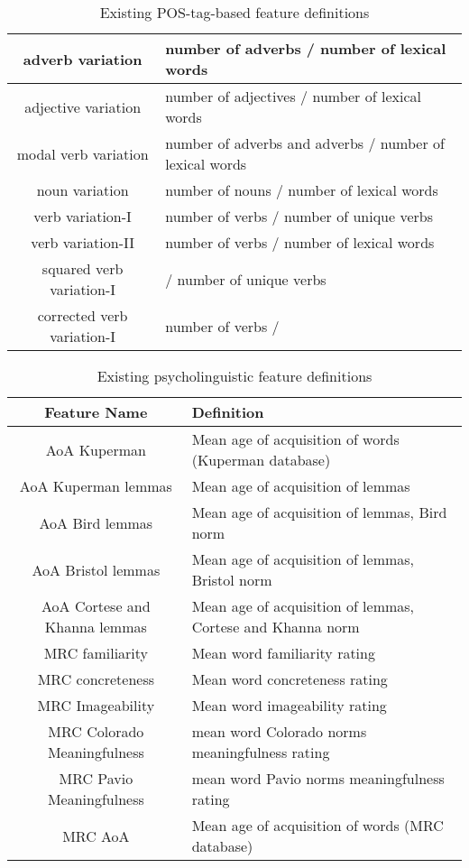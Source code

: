 \documentclass[11pt,a4paper]{article}
\theoremstyle{definition}
\begin{document}
\begin{table}
\begin{tabular}{|c|p{10cm}|}
adverb variation & number of adverbs / number of lexical words \\\hline
adjective variation & number of adjectives / number of lexical words \\\hline
modal verb variation & number of adverbs and adverbs / number of lexical words \\\hline
noun variation & number of nouns / number of lexical words \\\hline
verb variation-I & number of verbs / number of unique verbs \\\hline
verb variation-II & number of verbs / number of lexical words \\\hline
squared verb variation-I &  / number of unique verbs \\\hline
corrected verb variation-I & number of verbs /  \\\hline
\end{tabular}
\caption{Existing POS-tag-based feature definitions}
\end{table}

\begin{table}
\centering
\begin{tabular}{|c|p{10cm}|}
\hline
\textbf{Feature Name} & \textbf{Definition} \\\hline
AoA Kuperman & Mean age of acquisition of words (Kuperman database) \\\hline
AoA Kuperman lemmas & Mean age of acquisition of lemmas \\\hline
AoA Bird lemmas & Mean age of acquisition of lemmas, Bird norm \\\hline
AoA Bristol lemmas & Mean age of acquisition of lemmas, Bristol norm \\\hline
AoA Cortese and Khanna lemmas & Mean age of acquisition of lemmas, Cortese and Khanna norm \\\hline
MRC familiarity & Mean word familiarity rating \\\hline
MRC concreteness & Mean word concreteness rating \\\hline
MRC Imageability & Mean word imageability rating \\\hline
MRC Colorado Meaningfulness & mean word Colorado norms meaningfulness rating \\\hline
MRC Pavio Meaningfulness & mean word Pavio norms meaningfulness rating \\\hline
MRC AoA & Mean age of acquisition of words (MRC database) \\\hline
\end{tabular}
\caption{Existing psycholinguistic feature definitions}
\end{table}
\end{document}

